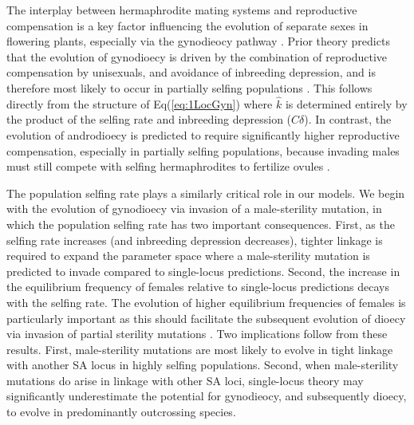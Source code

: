 \documentclass[9pt,twocolumn,twoside,lineno]{gsajnl}
\begin{document}
The interplay between hermaphrodite mating systems and reproductive compensation is a key factor influencing the evolution of separate sexes in flowering plants, especially via the gynodieocy pathway \citep{Darwin1877,Charlesworth1978a}. Prior theory predicts that the evolution of gynodioecy is driven by the combination of reproductive compensation by unisexuals, and avoidance of inbreeding depression, and is therefore most likely to occur in partially selfing populations \citep{Lewis1942,Lloyd1975,Charlesworth1978a,KaferPannell2017}. This follows directly from the structure of Eq(\ref{eq:1LocGyn}) where $\hat{k}$ is determined entirely by the product of the selfing rate and inbreeding depression ($C \delta$). In contrast, the evolution of androdioecy is predicted to require significantly higher reproductive compensation, especially in partially selfing populations, because invading males must still compete with selfing hermaphrodites to fertilize ovules \citep{Charlesworth1978b,KaferPannell2017}. 

The population selfing rate plays a similarly critical role in our models. We begin with the evolution of gynodioecy via invasion of a male-sterility mutation, in which the population selfing rate has two important consequences. First, as the selfing rate increases (and inbreeding depression decreases), tighter linkage is required to expand the parameter space where a male-sterility mutation is predicted to invade compared to single-locus predictions. Second, the increase in the equilibrium frequency of females relative to single-locus predictions decays with the selfing rate. The evolution of higher equilibrium frequencies of females is particularly important as this should facilitate the subsequent evolution of dioecy via invasion of partial sterility mutations \citep{Charlesworth1978a,Charlesworth1978b,Charlesworth1999,Charlesworth2006}. Two implications follow from these results. First, male-sterility mutations are most likely to evolve in tight linkage with another SA locus in highly selfing populations. Second, when male-sterility mutations do arise in linkage with other SA loci, single-locus theory may significantly underestimate the potential for gynodieocy, and subsequently dioecy, to evolve in predominantly outcrossing species. 
\end{document}
